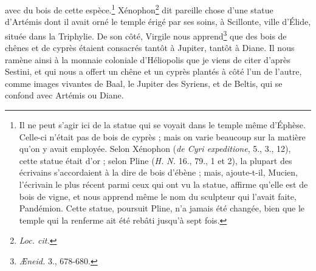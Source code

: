 \documentclass{article}
\begin{document}
avec du bois de cette espèce.\footnote{Il ne peut s'agir ici de la statue qui se voyait dans le temple même d'Éphèse. Celle-ci n'était pas de bois de cyprès ; mais on varie beaucoup sur la matière qu'on y avait employée. Selon Xénophon (\emph{de Cyri expeditione}, 5., 3., 12), cette statue était d'or ; selon Pline (\emph{H. N.} 16., 79., 1 et 2), la plupart des écrivains s'accordaient à la dire de bois d'ébène ; mais, ajoute-t-il, Mucien, l'écrivain le plus récent parmi ceux qui ont vu la statue, affirme qu'elle est de bois de vigne, et nous apprend même le nom du sculpteur qui l'avait faite, Pandémion. Cette statue, poursuit Pline, n'a jamais été changée, bien que le temple qui la renferme ait été rebâti jusqu'à sept fois.} Xénophon\footnote{\emph{Loc. cit.}} dit pareille chose d'une statue d'Artémis dont il avait orné le temple érigé par ses soins, à Scillonte, ville d'Élide, située dans la Triphylie. De son côté, Virgile nous apprend\footnote{\emph{Æneid.} 3., 678-680.} que des bois de chênes et de cyprès étaient consacrés tantôt à Jupiter, tantôt à Diane. Il nous ramène ainsi à la monnaie coloniale d'Héliopolis que je viens de citer d'après Sestini, et qui nous a offert un chêne et un cyprès plantés à côté l'un de l'autre, comme images vivantes de Baal, le Jupiter des Syriens, et de Beltis, qui se confond avec Artémis ou Diane.
\end{document}
